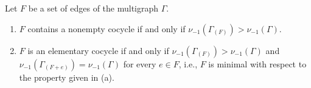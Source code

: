 Let $F$ be a set of edges of the multigraph $\Gamma$.

\begin{enumerate}
\item[(a)] $F$ contains a nonempty cocycle if and only if $\nu_{-1}(\Gamma_{(F)}) > \nu_{-1}(\Gamma)$.
\item[(b)] $F$ is an elementary cocycle if and only if $\nu_{-1}(\Gamma_{(F)}) > \nu_{-1}(\Gamma)$ and $\nu_{-1}(\Gamma_{(F+e)}) = \nu_{-1}(\Gamma)$ for every $e \in F$, i.e., $F$ is minimal with respect to the property given in (a).
\end{enumerate}
